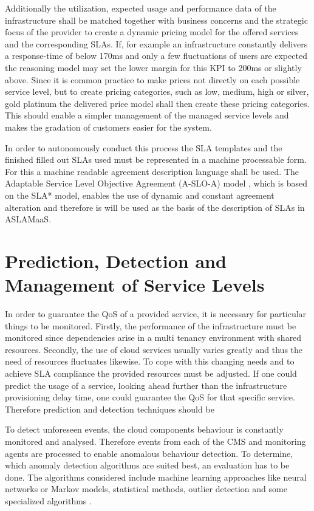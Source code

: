 Additionally the utilization, expected usage and performance data of the infrastructure shall be matched together with business concerns and the strategic focus of the provider to create a dynamic pricing model for the offered services and the corresponding SLAs. If, for example an infrastructure constantly delivers a response-time of below 170ms and only a few fluctuations of users are expected the reasoning model may set the lower margin for this KPI to 200ms or slightly above. Since it is common practice to make prices not directly on each possible service level, but to create pricing categories, such as low, medium, high or silver, gold platinum the delivered price model shall then create these pricing categories. This should enable a simpler management of the managed service levels and makes the gradation of customers easier for the system.
  
In order to autonomously conduct this process the SLA templates and the finished filled out SLAs used must be represented in a machine processable form. For this a machine readable agreement description language shall be used. The Adaptable Service Level Objective Agreement (A-SLO-A) model  \cite{A-SLO-A}, which is based on the SLA* model, enables the use of dynamic and constant agreement alteration and therefore is will be used as the basis of the description of SLAs in ASLAMaaS.


\section{Prediction, Detection and Management of Service Levels} \label{SLA prediction}
In order to guarantee the QoS of a provided service, it is necessary for particular things to be monitored. Firstly, the performance of the infrastructure must be monitored since dependencies arise in a multi tenancy environment with shared resources. Secondly, the use of cloud services usually varies greatly and thus the need of resources fluctuates likewise. To cope with this changing needs and to achieve SLA  compliance the provided resources must be adjusted. If one could predict the usage of a service, looking ahead further than the infrastructure provisioning delay time, one could guarantee the QoS for that specific service. Therefore prediction and detection techniques should be 

To detect unforeseen events, the cloud components behaviour is constantly monitored and analysed. Therefore events from each of the CMS and monitoring agents are processed to enable anomalous behaviour detection. 
To determine, which anomaly detection algorithms are suited best, an evaluation has to be done. The algorithms considered include machine learning approaches like neural networks or Markov models, statistical methods, outlier detection and some specialized algorithms  \cite{Anomaly2}. %

